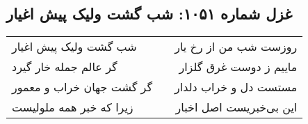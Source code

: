 \begin{center}
\section*{غزل شماره ۱۰۵۱: شب گشت ولیک پیش اغیار}
\label{sec:1051}
\begin{longtable}{l p{0.5cm} r}
شب گشت ولیک پیش اغیار
&&
روزست شب من از رخ یار
\\
گر عالم جمله خار گیرد
&&
ماییم ز دوست غرق گلزار
\\
گر گشت جهان خراب و معمور
&&
مستست دل و خراب دلدار
\\
زیرا که خبر همه ملولیست
&&
این بی‌خبریست اصل اخبار
\\
\end{longtable}
\end{center}
